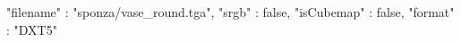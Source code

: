{ 
	"filename" : "sponza/vase_round.tga", 
	"srgb" : false,
	"isCubemap" : false,
	"format" : "DXT5"
}